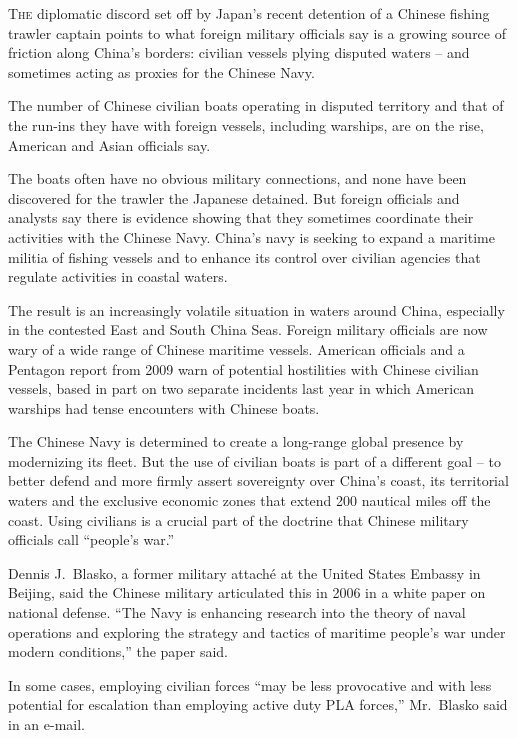 ﻿\documentclass[12pt]{article}
\begin{document}
\lettrine{T}{he} diplomatic discord set off by Japan's recent detention of a
Chinese fishing trawler captain points to what foreign military officials say is a growing source of
friction along China's borders: civilian vessels plying disputed waters -- and sometimes acting as
proxies for the Chinese Navy.

The number of Chinese civilian boats operating in disputed territory and that of the run-ins they
have with foreign vessels, including warships, are on the rise, American and Asian officials say.

The boats often have no obvious military connections, and none have been discovered for the trawler
the Japanese detained. But foreign officials and analysts say there is evidence showing that they
sometimes coordinate their activities with the Chinese Navy. China's navy is seeking to expand a
maritime militia of fishing vessels and to enhance its control over civilian agencies that regulate
activities in coastal waters.

The result is an increasingly volatile situation in waters around China, especially in the contested
East and South China Seas. Foreign military officials are now wary of a wide range of Chinese
maritime vessels. American officials and a Pentagon report from 2009 warn of potential hostilities
with Chinese civilian vessels, based in part on two separate incidents last year in which American
warships had tense encounters with Chinese boats.

The Chinese Navy is determined to create a long-range global presence by modernizing its fleet. But
the use of civilian boats is part of a different goal -- to better defend and more firmly assert
sovereignty over China's coast, its territorial waters and the exclusive economic zones that extend
200 nautical miles off the coast. Using civilians is a crucial part of the doctrine that Chinese
military officials call ``people's war.''

Dennis J.~Blasko, a former military attach\'e at the United States Embassy in Beijing, said the
Chinese military articulated this in 2006 in a white paper on national defense. ``The Navy is
enhancing research into the theory of naval operations and exploring the strategy and tactics of
maritime people's war under modern conditions,'' the paper said.

In some cases, employing civilian forces ``may be less provocative and with less potential for
escalation than employing active duty PLA forces,'' Mr.~Blasko said in an e-mail.
\end{document}
